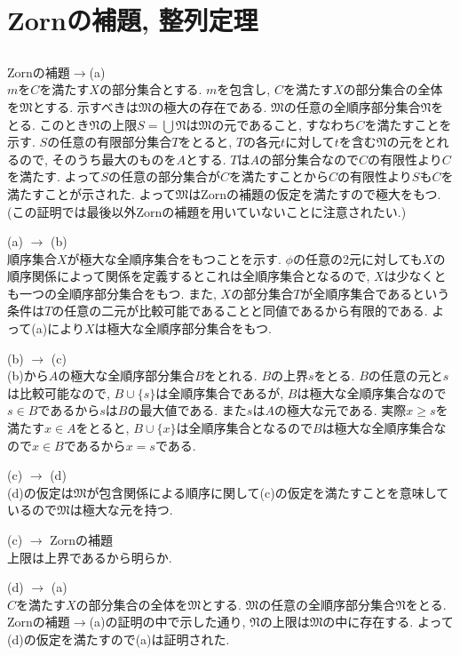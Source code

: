 \documentclass{jsarticle}
\begin{document}
\section{Zornの補題, 整列定理} %
\subsection{} %
Zornの補題$ \rightarrow $(a)\\	
$m$を$C$を満たす$X$の部分集合とする. $m$を包含し, $C$を満たす$X$の部分集合の全体を$\mathfrak{M}$とする. 示すべきは$\mathfrak{M}$の極大の存在である. $\mathfrak{M}$の任意の全順序部分集合$\mathfrak{N}$をとる. このとき$\mathfrak{N}$の上限$S = \bigcup \mathfrak{N}$は$\mathfrak{M}$の元であること, すなわち$C$を満たすことを示す. $S$の任意の有限部分集合$T$をとると, $T$の各元$t$に対して$t$を含む$\mathfrak{N}$の元をとれるので, そのうち最大のものを$A$とする. $T$は$A$の部分集合なので$C$の有限性より$C$を満たす. よって$S$の任意の部分集合が$C$を満たすことから$C$の有限性より$S$も$C$を満たすことが示された. よって$\mathfrak{M}$はZornの補題の仮定を満たすので極大をもつ. (この証明では最後以外Zornの補題を用いていないことに注意されたい.)

(a) $ \rightarrow $ (b)\\
順序集合$X$が極大な全順序集合をもつことを示す. $\phi$の任意の2元に対しても$X$の順序関係によって関係を定義するとこれは全順序集合となるので, $X$は少なくとも一つの全順序部分集合をもつ. また, $X$の部分集合$T$が全順序集合であるという条件は$T$の任意の二元が比較可能であることと同値であるから有限的である. よって(a)により$X$は極大な全順序部分集合をもつ.

(b) $ \rightarrow $ (c)\\
(b)から$A$の極大な全順序部分集合$B$をとれる. $B$の上界$s$をとる. $B$の任意の元と$s$は比較可能なので, $B \cup \{s\}$は全順序集合であるが, $B$は極大な全順序集合なので$s \in B$であるから$s$は$B$の最大値である. また$s$は$A$の極大な元である. 実際$x \ge s$を満たす$x \in A$をとると, $B \cup \{x\}$は全順序集合となるので$B$は極大な全順序集合なので$x \in B$であるから$x = s$である.

(c) $ \rightarrow $ (d)\\
(d)の仮定は$\mathfrak{M}$が包含関係による順序に関して(c)の仮定を満たすことを意味しているので$\mathfrak{M}$は極大な元を持つ.

(c) $ \rightarrow $ Zornの補題\\
上限は上界であるから明らか.

(d) $ \rightarrow $ (a)\\
$C$を満たす$X$の部分集合の全体を$\mathfrak{M}$とする. $\mathfrak{M}$の任意の全順序部分集合$\mathfrak{N}$をとる. Zornの補題$\rightarrow$(a)の証明の中で示した通り, $\mathfrak{N}$の上限は$\mathfrak{M}$の中に存在する. よって(d)の仮定を満たすので(a)は証明された.
\end{document}
